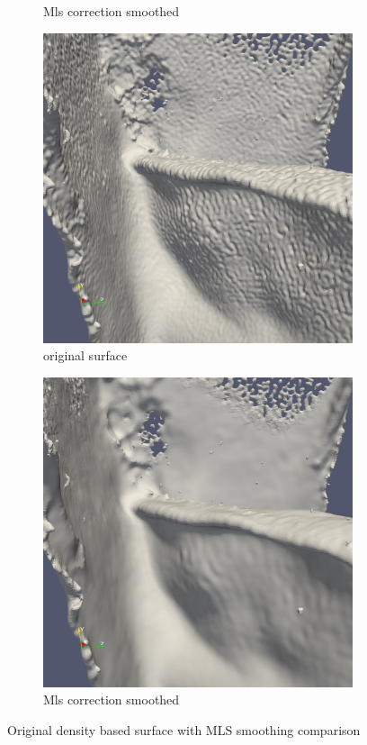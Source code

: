 \begin{figure}
\begin{center}
\begin{subfigure}[b]{0.47\textwidth}
			\caption{Mls correction smoothed}
		\end{subfigure}
		\begin{subfigure}[b]{0.47\textwidth}
			\includegraphics[width=\textwidth]{figures/DDMOriginal2.png}
			\caption{original surface}
		\end{subfigure}
		\begin{subfigure}[b]{0.47\textwidth}
			\includegraphics[width=\textwidth]{figures/DDMMls2.png}
			\caption{Mls correction smoothed}
		\end{subfigure}
	\end{center}
	\caption{Original density based surface with MLS smoothing comparison} \label{fig:db_mls_reconstruction1}
\end{figure}
